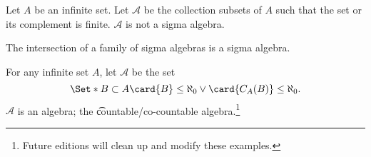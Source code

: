 \begin{expl}
  Let $A$ be an infinite set.
  Let $\mathcal{A}$ be the collection
  subsets of $A$ such that the set or its
  complement is finite.
  $\mathcal{A}$ is not a sigma algebra.
\end{expl}


\begin{prop}
  The intersection of a family of sigma algebras is
  a sigma algebra.
  \label{sigma_algebra:sigmaintersection}
\end{prop}

\begin{expl}
  For any infinite set $A$,
  let $\mathcal{A}$ be the set
  $$
  \Set*{
    B \subset A
  }{
    \card{B} \leq \aleph_0 \lor
    \card{C_{A}(B)} \leq \aleph_0
  }.
  $$
  $\mathcal{A}$ is an algebra;
  the
  \t{countable/co-countable algebra}.\footnote{Future editions will clean up and modify these examples.}
\end{expl}
